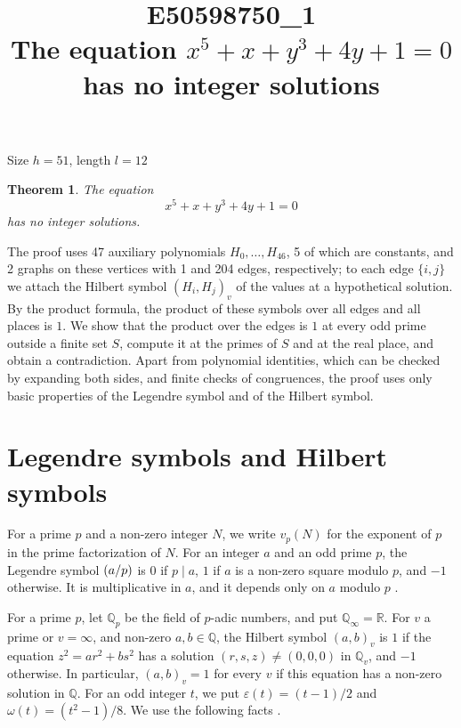 \documentclass[11pt]{article}
\title{\textbf{E50598750\_1}\\[4pt] {\Large The equation $x^{5}+x+y^{3}+4y+1=0$ has no integer solutions}}
\author{}
\date{}
\newtheorem{theorem}{Theorem}
\newcommand{\Q}{\mathbb{Q}}
\newcommand{\leg}[2]{\mathchoice{\biggl(\dfrac{#1}{#2}\biggr)}{(#1/#2)}{(#1/#2)}{(#1/#2)}}
\begin{document}
\maketitle
\vspace{-8ex}
\begin{center}
Size $h=51$, length $l=12$
\end{center}

\begin{theorem}\label{thm:main}
The equation
\begin{equation}\label{eq:main}
x^{5}+x+y^{3}+4y+1=0
\end{equation}
has no integer solutions.
\end{theorem}

The proof uses 47 auxiliary polynomials $H_0,\dots,H_{46}$, 5 of which are constants, and 2 graphs on these vertices with 1 and 204 edges, respectively; to each edge $\{i,j\}$ we attach the Hilbert symbol $(H_i,H_j)_v$ of the values at a hypothetical solution. By the product formula, the product of these symbols over all edges and all places is $1$. We show that the product over the edges is $1$ at every odd prime outside a finite set $S$, compute it at the primes of $S$ and at the real place, and obtain a contradiction. Apart from polynomial identities, which can be checked by expanding both sides, and finite checks of congruences, the proof uses only basic properties of the Legendre symbol and of the Hilbert symbol.

\section{Legendre symbols and Hilbert symbols}

For a prime $p$ and a non-zero integer $N$, we write $v_p(N)$ for the exponent of $p$ in the prime factorization of $N$. For an integer $a$ and an odd prime $p$, the Legendre symbol $\leg{a}{p}$ is $0$ if $p\mid a$, $1$ if $a$ is a non-zero square modulo $p$, and $-1$ otherwise. It is multiplicative in $a$, and it depends only on $a$ modulo $p$ \cite[Chapter~5]{IR}.

For a prime $p$, let $\Q_p$ be the field of $p$-adic numbers, and put $\Q_\infty=\mathbb R$. For $v$ a prime or $v=\infty$, and non-zero $a,b\in\Q$, the Hilbert symbol $(a,b)_v$ is $1$ if the equation $z^2=ar^2+bs^2$ has a solution $(r,s,z)\neq(0,0,0)$ in $\Q_v$, and $-1$ otherwise. In particular, $(a,b)_v=1$ for every $v$ if this equation has a non-zero solution in $\Q$. For an odd integer $t$, we put $\varepsilon(t)=(t-1)/2$ and $\omega(t)=(t^2-1)/8$. We use the following facts \cite[Chapter~III, Proposition~2 and Theorems~1 and~3]{Se}.
\end{document}
